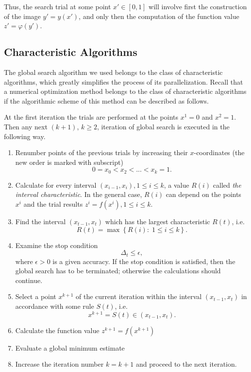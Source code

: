 \documentclass{svproc}
\begin{document}
Thus, the search trial at some point $x'\in[0,1]$ will involve first the construction of the image $y'=y(x')$, and only then the computation of the function value $ z' = \varphi(y')$.

\subsection{Characteristic Algorithms}

The global search algorithm we used belongs to the class of characteristic algorithms, which greatly simplifies the process of its parallelization. Recall that a numerical optimization method belongs to the class of characteristic algorithms if the algorithmic scheme of this method can be described as follows.

At the first iteration the trials are performed at the points $x^1 = 0$ and $x^2 = 1$. Then any next $(k+1)$, $k \geq 2$, iteration of global search is executed in the following way.

\begin{enumerate}
	\item 
Renumber points of the previous trials by increasing their $x$-coordinates (the new order is marked with subscript)
\[
0=x_0<x_2<...<x_{k}=1.
\]

	\item 
Calculate for every interval $(x_{i-1},x_i), 1\leq i\leq k$, a value $R(i)$ called \textit{the interval characteristic}. In the general case, $R(i)$ can depend on the points $x^i$ and the trial results $z^i=f(x^i), 1 \leq i \leq k$.

	\item 
Find the interval $(x_{t-1},x_t)$ which has the largest characteristic $R(t)$, i.e.
\[
R(t) = \max \left\{ R(i): \; 1\leq i\leq k \right\}.
\]

	\item 
Examine the stop condition
\[
\Delta_t \leq \epsilon ,
\]
where $\epsilon>0$ is a given accuracy. If the stop condition is satisfied, then the global search has to be terminated; otherwise the calculations should continue.

	\item 
Select a point $x^{k+1}$ of the current iteration within the interval $(x_{t-1},x_t)$ in accordance with some rule $S(t)$, i.e.
\[
x^{k+1} = S(t)\in(x_{t-1},x_t).
\]
	
	\item 
Calculate the function value $z^{k+1} = f(x^{k+1})$

	\item 
Evaluate a global minimum estimate 

	\item 
Increase the iteration number $k=k+1$ and proceed to the next iteration.
\end{enumerate}
\end{document}
